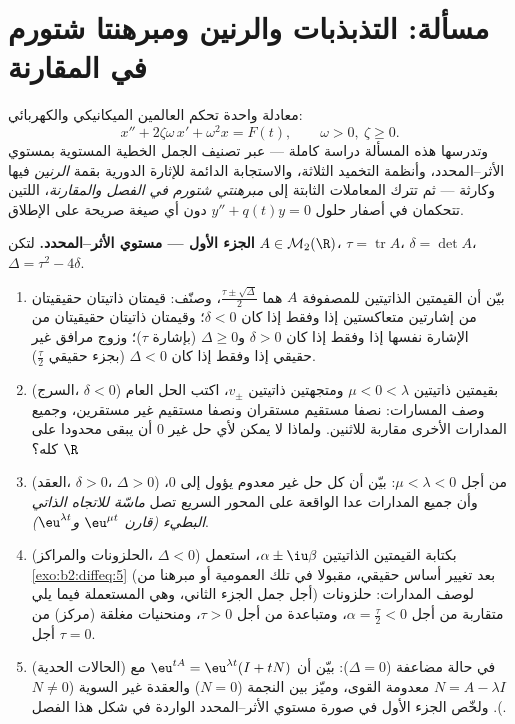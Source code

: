 \section{مسألة: التذبذبات والرنين ومبرهنتا شتورم في المقارنة}

\begin{problem}\label{pb:b2:diffeq:1}
معادلة واحدة تحكم العالمين الميكانيكي والكهربائي:
\[
x'' + 2\zeta\omega\,x' + \omega^2 x = F(t),
\qquad \omega > 0,\ \zeta \geq 0 .
\]
وتدرسها هذه المسألة دراسة كاملة --- عبر تصنيف الجمل الخطية المستوية
بمستوي الأثر--المحدد، وأنظمة التخميد الثلاثة، والاستجابة الدائمة
للإثارة الدورية بقمة \emph{الرنين} فيها وكارثة 
--- ثم تترك المعاملات الثابتة إلى \emph{مبرهنتي شتورم في الفصل
والمقارنة}، اللتين تتحكمان في أصفار
حلول $y'' + q(t)y = 0$ دون أي صيغة صريحة على الإطلاق.

\medskip
\noindent\textbf{الجزء الأول --- مستوي الأثر--المحدد.} لتكن
$A \in \mathcal M_2(\R)$، $\tau = \operatorname{tr}A$، $\delta
= \det A$، $\Delta = \tau^2 - 4\delta$.
\begin{enumerate}
  \item بيّن أن القيمتين الذاتيتين للمصفوفة $A$ هما $\frac{\tau\pm\sqrt\Delta}{2}$، وصنّف:
        قيمتان ذاتيتان حقيقيتان من إشارتين متعاكستين إذا وفقط إذا
        كان $\delta < 0$؛ وقيمتان ذاتيتان حقيقيتان من الإشارة نفسها إذا
        وفقط إذا كان $\delta > 0$ و$\Delta
        \geq 0$ (بإشارة $\tau$)؛ وزوج مرافق غير
        حقيقي إذا وفقط إذا كان $\Delta < 0$ (بجزء حقيقي $\frac\tau2$).
  \item (السرج، $\delta < 0$) بقيمتين ذاتيتين $\mu < 0 <
        \lambda$ ومتجهتين ذاتيتين
        $v_\pm$، اكتب الحل العام وصف المسارات: نصفا مستقيم مستقران
        ونصفا مستقيم غير مستقرين، وجميع المدارات الأخرى مقاربة
        للاثنين. ولماذا لا يمكن لأي حل غير $0$ أن يبقى محدودا على
        $\R$ كله؟
  \item (العقد، $\delta > 0$، $\Delta > 0$) من أجل $\mu < \lambda
        < 0$: بيّن أن كل حل غير
        معدوم يؤول إلى $0$، وأن جميع المدارات عدا الواقعة على
        المحور السريع تصل \emph{ماسّة للاتجاه الذاتي البطيء}
        \emph{(قارن $\eu^{\mu t}$ و$\eu^{\lambda t}$)}.
  \item (الحلزونات والمراكز، $\Delta < 0$) بكتابة القيمتين الذاتيتين
        $\alpha \pm \iu\beta$، استعمل \cref{exo:b2:diffeq:5} (بعد تغيير أساس حقيقي، مقبولا في تلك
        العمومية أو مبرهنا من أجل جمل الجزء الثاني، وهي المستعملة
        فيما يلي) لوصف المدارات: حلزونات متقاربة من أجل $\alpha =
        \frac\tau2 < 0$،
        ومتباعدة من أجل $\tau > 0$، ومنحنيات مغلقة (مركز) من أجل $\tau = 0$.
  \item (الحالات الحدية) في حالة  مضاعفة ($\Delta =
        0$): بيّن
        أن $\eu^{tA} = \eu^{\lambda t}(I + tN)$ مع $N
        = A - \lambda I$ معدومة القوى، وميّز بين النجمة ($N = 0$)
        والعقدة غير السوية ($N \neq 0$).
        ولخّص الجزء الأول في صورة مستوي الأثر--المحدد الواردة في شكل
        هذا الفصل.
\end{enumerate}


\end{problem}
